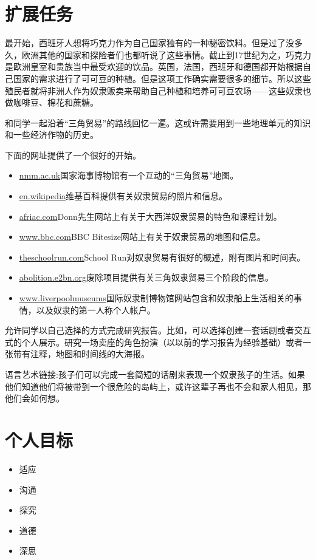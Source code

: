 \section{扩展任务}
   最开始，西班牙人想将巧克力作为自己国家独有的一种秘密饮料。但是过了没多久，欧洲其他的国家和探险者们也都听说了这些事情。截止到17世纪为之，巧克力是欧洲皇室和贵族当中最受欢迎的饮品。英国，法国，西班牙和德国都开始根据自己国家的需求进行了可可豆的种植。但是这项工作确实需要很多的细节。所以这些殖民者就将非洲人作为奴隶贩卖来帮助自己种植和培养可可豆农场——这些奴隶也做咖啡豆、棉花和蔗糖。\par
   和同学一起沿着“三角贸易”的路线回忆一遍。这或许需要用到一些地理单元的知识和一些经济作物的历史。\par
   下面的网址提供了一个很好的开始。\par
   \begin{itemize}
      \item \href{http://www.nmm.ac.uk/freedom/viewTheme.cfm/theme/triangular}{nmm.ac.uk}国家海事博物馆有一个互动的“三角贸易”地图。
      \item \href{https://en.wikipedia.org/wiki/Atlantic_slave_trade}{en.wikipedia}维基百科提供有关奴隶贸易的照片和信息。
      \item  \href{https://africa.mrdonn.org/slavetrade.html}{afriac.com}Donn先生网站上有关于大西洋奴隶贸易的特色和课程计划。
      \item  \href{http://www.bbc.co.uk/bitesize/ks3/history/industrial_era/the_slave_trade/revision/4/}{www.bbc.com}BBC Bitesize网站上有关于奴隶贸易的地图和信息。
      \item  \href{http://www.theschoolrun.com/homework-help/the-atlantic-slave-trade}{theschoolrun.com}School Run对奴隶贸易有很好的概述，附有图片和时间表。
      \item  \href{http://abolition.e2bn.org/slavery_43.html}{abolition.e2bn.org}废除项目提供有关三角奴隶贸易三个阶段的信息。
      \item  \href{http://www.liverpoolmuseums.org.uk/ism/slavery/}{www.liverpoolmuseums}国际奴隶制博物馆网站包含和奴隶船上生活相关的事情，以及奴隶的第一人称个人帐户。
   \end{itemize}
   允许同学以自己选择的方式完成研究报告。比如，可以选择创建一套话剧或者交互式的个人展示。研究一场卖座的角色扮演（以以前的学习报告为经验基础）或者一张带有注释，地图和时间线的大海报。\par
   语言艺术链接:孩子们可以完成一套简短的话剧来表现一个奴隶孩子的生活。如果他们知道他们将被带到一个很危险的岛屿上，或许这辈子再也不会和家人相见，那他们会如何想。
   

\section{个人目标}
  \begin{itemize}
     \item 适应
     \item 沟通
     \item 探究
     \item 道德
     \item 深思
  \end{itemize}  
